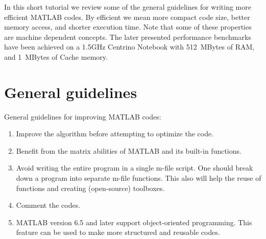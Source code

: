 \documentclass[10pt,a4paper]{article}
\begin{document}
In this short tutorial we review some of the general guidelines for writing more efficient MATLAB codes. By efficient we mean more compact code size, better memory access, and shorter execution time. Note that some of these properties are machine dependent concepts. The later presented performance benchmarks have been achieved on a 1.5GHz Centrino Notebook with 512~MBytes of RAM, and 1~MBytes of Cache memory.
\section{General guidelines}
\label{sec:general}
General guidelines for improving MATLAB codes:
\begin{enumerate}
\item Improve the algorithm before attempting to optimize the code.
\item Benefit from the matrix abilities of MATLAB and its built-in functions.
\item Avoid writing the entire program in a single m-file script. One should break down a program into separate m-file functions. This also will help the reuse of functions and creating (open-source) toolboxes. 
\item Comment the codes.
\item MATLAB version 6.5 and later support object-oriented programming. This feature can be used to make more structured and reusable codes.
\end{enumerate}

\end{document}
